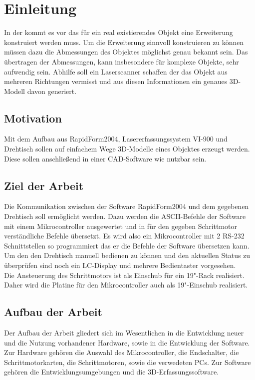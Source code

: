 \chapter{Einleitung}
\label{cha:Einleitung}
In der   kommt es vor das für ein real existierendes Objekt eine Erweiterung konstruiert werden muss. Um die Erweiterung sinnvoll konstruieren zu können müssen dazu die Abmessungen des Objektes möglichst genau bekannt sein. Das übertragen der Abmessungen, kann insbesondere für komplexe Objekte, sehr aufwendig sein.
Abhilfe soll ein Laserscanner schaffen der das Objekt aus mehreren Richtungen vermisst und aus diesen Informationen ein genaues 3D-Modell davon generiert. 

\section{Motivation}
\label{sec:Motivation}
Mit dem Aufbau aus RapidForm2004, Lasererfassungssystem VI-900 und Drehtisch sollen auf einfachem Wege 3D-Modelle eines Objektes erzeugt werden. Diese sollen anschließend in einer CAD-Software wie  nutzbar sein.

\section{Ziel der Arbeit}
\label{sec:ZielDerArbeit}
Die Kommunikation zwischen der Software RapidForm2004 und dem gegebenen Drehtisch soll ermöglicht werden. Dazu werden die ASCII-Befehle der Software mit einem Mikrocontroller ausgewertet und in für den gegeben Schrittmotor verständliche Befehle übersetzt.
Es wird also ein Mikrocontroller mit 2 RS-232 Schnittstellen so programmiert das er die Befehle der Software übersetzen kann. Um den den Drehtisch manuell bedienen zu können und den aktuellen Status zu überprüfen sind noch ein LC-Display und mehrere Bedientaster vorgesehen.\\
Die Ansteuerung des Schrittmotors ist als Einschub für ein 19"-Rack realisiert. Daher wird die Platine für den Mikrocontroller auch als 19"-Einschub realisiert.


\section{Aufbau der Arbeit}
\label{sec:AufbauDerArbeit}
Der Aufbau der Arbeit gliedert sich im Wesentlichen in die Entwicklung neuer und die Nutzung vorhandener Hardware, sowie in die Entwicklung der Software. \\
Zur Hardware gehören die Auswahl des Mikrocontroller, die Endschalter, die Schrittmotorkarten, die Schrittmotoren, sowie die verwedeten PCs.
Zur Software gehören die Entwicklungsumgebungen und die 3D-Erfassungssoftware.

